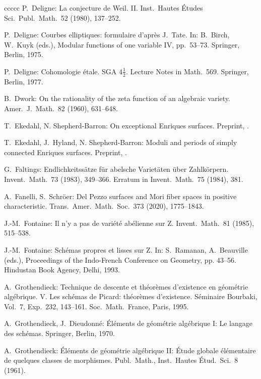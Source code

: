 \documentclass[oneside, 12pt]{amsart}
\theoremstyle{definition}
\theoremstyle{remark}
\begin{document}
\begin{thebibliography}{ccccc}
P.\  Deligne:
La conjecture de Weil. II. 
Inst.\ Hautes \'Etudes Sci.\ Publ.\ Math.\  52 (1980), 137--252. 

P.\ Deligne:
Courbes elliptiques: formulaire d'apr\`es J.\ Tate. 
In: 
B.\ Birch, W.\ Kuyk (eds.),
Modular functions of one variable IV,  pp.\ 53--73. 
Springer, Berlin, 1975.

P.\ Deligne:
Cohomologie \'etale.  SGA 4$\frac{1}{2}$. 
Lecture Notes in Math.\ 569.
Springer, Berlin, 1977.

B.\ Dwork:
On the rationality of the zeta function of an algebraic variety. 
Amer.\ J.\ Math.\ 82 (1960), 631--648.

T.\ Ekedahl, N. Shepherd-Barron:
On exceptional Enriques surfaces.
Preprint, .

T.\ Ekedahl, J.\ Hyland, N. Shepherd-Barron:
Moduli and periods of simply connected Enriques surfaces.
Preprint, .

G.\ Faltings:
Endlichkeitss\"atze f\"ur abelsche Variet\"aten über Zahlk\"orpern.  
Invent.\ Math.\ 73 (1983),  349--366. 
Erratum in Invent.\ Math.\ 75 (1984),  381. 

A.\ Fanelli, S.\ Schr\"oer:
Del Pezzo surfaces and Mori fiber spaces in positive characteristic.
Trans.\ Amer.\ Math.\ Soc.\  373 (2020),  1775--1843.

J.-M.\ Fontaine:
Il n'y a pas de vari\'et\'e ab\'elienne sur Z.  
Invent.\ Math.\ 81 (1985),  515--538. 

J.-M.\ Fontaine:
Sch\'emas propres et lisses sur Z.
In: 
S.\ Ramanan, A.\ Beauville (eds.), Proceedings of the Indo-French Conference on Geometry, pp. 43--56.
Hindustan Book Agency, Delhi, 1993. 

A.\ Grothendieck:
Technique de descente et th\'eor\`emes d'existence en g\'eom\'etrie alg\'ebrique. V. 
Les schémas de Picard: th\'eor\`emes d'existence. 
S\'eminaire Bourbaki, Vol.\ 7, Exp.\ 232, 143--161.
Soc.\ Math.\ France, Paris, 1995. 

A.\ Grothendieck, J.\ Dieudonn\'e:
\'El\'ements de g\'eom\'etrie alg\'ebrique I:
Le langage des sch\'emas.
Springer, Berlin, 1970.

A.\ Grothendieck:
\'El\'ements de g\'eom\'etrie alg\'ebrique II:
\'Etude globale \'el\'ementaire de quelques classes de morphismes.
Publ.\ Math., Inst.\ Hautes \'Etud.\ Sci.\ 8 (1961).


\end{thebibliography}
\end{document}
